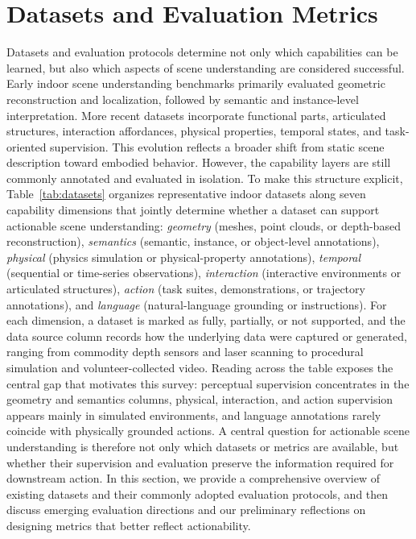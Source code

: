 \documentclass{SCIS2026}
\begin{document}
\section{Datasets and Evaluation Metrics}
\label{sec:data_and_simulation}
Datasets and evaluation protocols determine not only which capabilities can be learned, but also which aspects of scene understanding are considered successful. Early indoor scene understanding benchmarks primarily evaluated geometric reconstruction and localization, followed by semantic and instance-level interpretation. More recent datasets incorporate functional parts, articulated structures, interaction affordances, physical properties, temporal states, and task-oriented supervision. This evolution reflects a broader shift from static scene description toward embodied behavior. However, the capability layers are still commonly annotated and evaluated in isolation. To make this structure explicit, Table~\ref{tab:datasets} organizes representative indoor datasets along seven capability dimensions that jointly determine whether a dataset can support actionable scene understanding: \emph{geometry} (meshes, point clouds, or depth-based reconstruction), \emph{semantics} (semantic, instance, or object-level annotations), \emph{physical} (physics simulation or physical-property annotations), \emph{temporal} (sequential or time-series observations), \emph{interaction} (interactive environments or articulated structures), \emph{action} (task suites, demonstrations, or trajectory annotations), and \emph{language} (natural-language grounding or instructions). For each dimension, a dataset is marked as fully, partially, or not supported, and the data source column records how the underlying data were captured or generated, ranging from commodity depth sensors and laser scanning to procedural simulation and volunteer-collected video. Reading across the table exposes the central gap that motivates this survey: perceptual supervision concentrates in the geometry and semantics columns, physical, interaction, and action supervision appears mainly in simulated environments, and language annotations rarely coincide with physically grounded actions. A central question for actionable scene understanding is therefore not only which datasets or metrics are available, but whether their supervision and evaluation preserve the information required for downstream action. In this section, we provide a comprehensive overview of existing datasets and their commonly adopted evaluation protocols, and then discuss emerging evaluation directions and our preliminary reflections on designing metrics that better reflect actionability.
\end{document}
